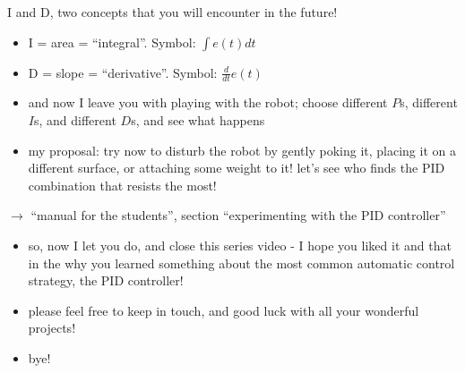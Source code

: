 \begin{frame}{I and D, two concepts that you will encounter in the future!}
	\pause
	\begin{itemize}
		\item I = area = ``integral''. \pause Symbol:
			$
				\int e(t) dt
			$
			\pause
			\vspace{0.5cm} 
		\item D = slope = ``derivative''. \pause Symbol:
			$
				\frac{d}{d t} e(t)
			$
	\end{itemize}
\end{frame}


\begin{frame}
	\begin{itemize}
		\item and now I leave you with playing with the robot; choose different $P$s, different $I$s, and different $D$s, and see what happens
		\item my proposal: try now to disturb the robot by gently poking it, placing it on a different surface, or attaching some weight to it! let's see who finds the PID combination that resists the most!
	\end{itemize}
\end{frame}


\begin{frame}
	\begin{center}
		$\rightarrow$ ``manual for the students'', section ``experimenting with the PID controller''
	\end{center}
\end{frame}


\begin{frame}
	\begin{itemize}
		\item so, now I let you do, and close this series video - I hope you liked it and that in the why you learned something about the most common automatic control strategy, the PID controller!
		\item please feel free to keep in touch, and good luck with all your wonderful projects!
		\item bye!
	\end{itemize}
\end{frame}


